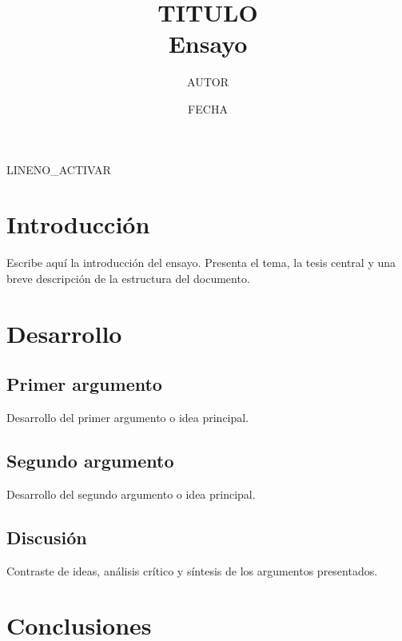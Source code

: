 \documentclass[12pt, a4paper]{report}
\title{
  \vspace{-2cm}
  {\LARGE {{TITULO}}} \\[0.5cm]
  {\large Ensayo}
}
\author{{{AUTOR}}}
\date{{{FECHA}}}
\begin{document}
\maketitle
\thispagestyle{empty}
\newpage

\tableofcontents
\newpage

{{LINENO_ACTIVAR}}

\chapter{Introducción}


Escribe aquí la introducción del ensayo. Presenta el tema, la tesis
central y una breve descripción de la estructura del documento.

\chapter{Desarrollo}

\section{Primer argumento}

Desarrollo del primer argumento o idea principal.

\section{Segundo argumento}

Desarrollo del segundo argumento o idea principal.

\section{Discusión}

Contraste de ideas, análisis crítico y síntesis de los argumentos
presentados.

\chapter{Conclusiones}
\end{document}
